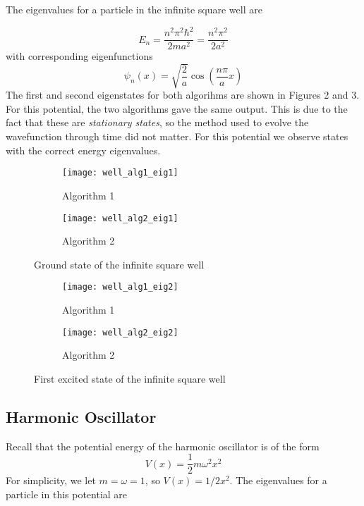 \documentclass{article}
\begin{document}
The eigenvalues for a particle in the infinite square well are

\begin{equation}
E_n = \frac{n^2 \pi^2 \hbar^2}{2 ma^2} = \frac{n^2 \pi ^2}{2 a^2}
\end{equation}
%
with corresponding eigenfunctions
\begin{equation}
\psi_n(x) = \sqrt{\frac{2}{a}} \cos \left( \frac{n\pi}{a} x \right)
\end{equation}
%
The first and second eigenstates for both algorihms are shown in Figures 2 and 3. For this potential, the two algorithms gave the same output. This is due to the fact that these are {\it stationary states}, so the method used to evolve the wavefunction through time did not matter. For this potential we observe states with the correct energy eigenvalues.


\begin{figure}
\centering
\begin{subfigure}[h!]{0.3\textwidth}
\centering
\texttt{[image: well\_alg1\_eig1]}
\caption{Algorithm 1}
\end{subfigure}
%
\begin{subfigure}[h!]{0.3\textwidth}
\centering
\texttt{[image: well\_alg2\_eig1]}
\caption{Algorithm 2}
\end{subfigure}

\caption{Ground state of the infinite square well}
\end{figure}

\begin{figure}
\centering
\begin{subfigure}[h!]{0.3\textwidth}
\centering
\texttt{[image: well\_alg1\_eig2]}
\caption{Algorithm 1}
\end{subfigure}
%
\begin{subfigure}[h!]{0.3\textwidth}
\centering
\texttt{[image: well\_alg2\_eig2]}
\caption{Algorithm 2}
\end{subfigure}

\caption{First excited state of the infinite square well}
\end{figure}
%
\subsection{Harmonic Oscillator}

Recall that the potential energy of the harmonic oscillator is of the form
\begin{equation}
V(x) = \frac{1}{2}m\omega^2x^2
\end{equation}
%
For simplicity, we let $m = \omega = 1$, so $V(x) = 1/2x^2$. The eigenvalues for a particle in this potential are
\end{document}
